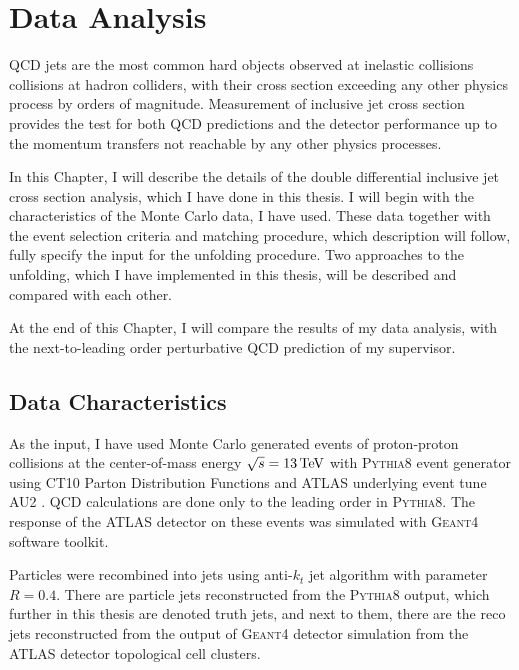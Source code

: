 \chapter{Data Analysis}


QCD jets are the most common hard objects observed at inelastic collisions 
collisions at hadron colliders, with their cross section exceeding any other
physics process by orders of magnitude.  Measurement of inclusive jet cross
section provides the test for both QCD predictions and the detector
performance up to the momentum transfers not reachable by any other physics
processes. 

In this Chapter, I will describe the details of the double differential
inclusive jet cross section analysis, which I have done in this thesis.
I will begin with the characteristics of the Monte Carlo data, I have used.
These data together with the event selection criteria and matching procedure,
which description will follow, fully specify the input for the unfolding
procedure. Two approaches to the unfolding, which I have implemented in this
thesis, will be described and compared with each other. 

At the end of this Chapter, I will compare the results of my data analysis, with
the next-to-leading order perturbative QCD prediction of my supervisor. 

\section{Data Characteristics}

As the input, I have used Monte Carlo generated events of proton-proton collisions at
the center-of-mass energy $\sqrt{s} = 13\,\text{TeV}$ with \textsc{Pythia8}
\cite{Pythia8} event generator using CT10 Parton Distribution Functions
\cite{CT10PDF} and ATLAS underlying event tune AU2 \cite{AU2}. QCD calculations
are done only to the leading order in
\textsc{Pythia8}. The response of the ATLAS detector on these events was
simulated with \textsc{Geant4} \cite{Geant4} software toolkit.

Particles were recombined into jets using anti-$k_t$ jet algorithm with parameter $R=0.4$.
There are particle jets reconstructed from the \textsc{Pythia8} output, which
further in this thesis are denoted truth jets, and next to them, there are the
reco jets reconstructed from the output of \textsc{Geant4} detector
simulation from the ATLAS detector topological cell clusters. 

